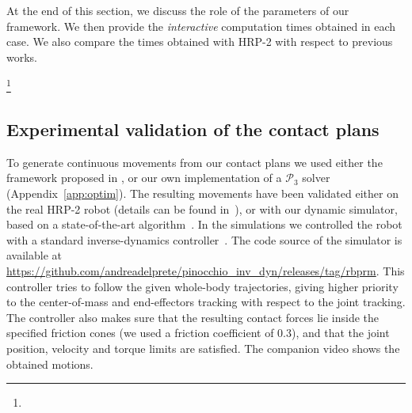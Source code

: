 \documentclass[journal]{IEEEtran}
\newcommand{\commentt}[2]{\textcolor{#1}{\textbf{\textit{[#2]}}}} 	%
\newcommand{\adnote}[1]{\commentt{blue}{AD: #1}}
\providecommand{\DIFaddtex}[1]{#1} %
\providecommand{\DIFdeltex}[1]{} %
\providecommand{\DIFaddbegin}{\protect\color{blue}} %
\providecommand{\DIFaddend}{\protect\color{black}} %
\providecommand{\DIFdelbegin}{\protect\cbdelete} %
\providecommand{\DIFdelend}{} %
\providecommand{\DIFadd}[1]{\texorpdfstring{\DIFaddtex{#1}}{#1}} %
\providecommand{\DIFdel}[1]{\texorpdfstring{\DIFdeltex{#1}}{}} %
\begin{document}
At the end of this section, we discuss the role of the parameters of our framework. We then provide the \textit{interactive} computation times obtained in each case.
We also compare the times obtained with HRP-2 with respect to previous works.

\DIFdelbegin \DIFdel{These scenarios complement the ones demonstrated on virtual avatars (Figure~\ref{fig:robots_old})in our previous ISRR paper~\citep{tonneauisrr15} and video}\footnote{%
}%
\addtocounter{footnote}{-1}%
\DIFdel{.
}\DIFdelend \DIFaddbegin \subsection{\DIFadd{Experimental validation of the contact plans}} \label{sec:valid}
\DIFadd{To generate continuous movements from our contact plans we used either the framework proposed in \cite{Carpentier2016}, or our own implementation of a $\mathcal{P}_3$ solver (Appendix~\ref{app:optim}).
The resulting movements have been validated either on the real HRP-2 robot (details can be found in~\cite{Carpentier2016}), or with our dynamic simulator, based on a state-of-the-art algorithm~\cite{Kaufman2008}.
In the simulations we controlled the robot with a standard inverse-dynamics controller~\cite{DelPrete2015b}. The code source of the simulator is available at }\url{https://github.com/andreadelprete/pinocchio_inv_dyn/releases/tag/rbprm}\DIFadd{.
This controller tries to follow the given whole-body trajectories, giving higher priority to the center-of-mass and end-effectors tracking with respect to the joint tracking.
The controller also makes sure that the resulting contact forces lie inside the specified friction cones (we used a friction coefficient of 0.3), and that the joint position, velocity and torque limits are satisfied.
The companion video shows the obtained motions.
}

\DIFaddend %
\end{document}

